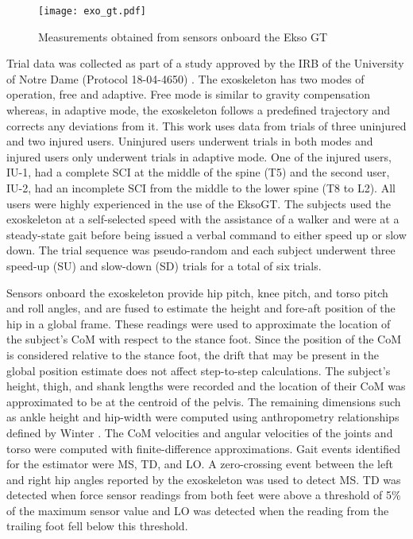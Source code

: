 \begin{figure}
	\centering
	\texttt{[image: exo\_gt.pdf]}
	\vspace{-1em}
	\caption[Measurements obtained from sensors onboard the Ekso GT]{Measurements obtained from sensors onboard the Ekso GT \cite{eksoOperator}}\label{fig:exoOperator}
	\vspace{-1em}
\end{figure}

Trial data was collected as part of a study approved by the IRB of the University of Notre Dame (Protocol 18-04-4650) \cite{gambon2020effects}. The exoskeleton has two modes of operation, free and adaptive. Free mode is similar to gravity compensation whereas, in adaptive mode, the exoskeleton follows a predefined trajectory and corrects any deviations from it. This work uses data from trials of three uninjured and two injured users. Uninjured users underwent trials in both modes and injured users only underwent trials in adaptive mode. One of the injured users, IU-1, had a complete SCI at the middle of the spine (T5) and the second user, IU-2, had an incomplete SCI from the middle to the lower spine (T8 to L2). All users were highly experienced in the use of the EksoGT. The subjects used the exoskeleton at a self-selected speed with the assistance of a walker and were at a steady-state gait before being issued a verbal command to either speed up or slow down. The trial sequence was pseudo-random and each subject underwent three speed-up (SU) and slow-down (SD) trials for a total of six trials.

Sensors onboard the exoskeleton provide hip pitch, knee pitch, and torso pitch and roll angles, and are fused to estimate the height and fore-aft position of the hip in a global frame. These readings were used to approximate the location of the subject's CoM with respect to the stance foot. Since the position of the CoM is considered relative to the stance foot, the drift that may be present in the global position estimate does not affect step-to-step calculations. The subject's height, thigh, and shank lengths were recorded and the location of their CoM was approximated to be at the centroid of the pelvis. The remaining dimensions such as ankle height and hip-width were computed using anthropometry relationships defined by Winter \cite{winter2009biomechanics}. The CoM velocities and angular velocities of the joints and torso were computed with finite-difference approximations. Gait events identified for the estimator were MS, TD, and LO. A zero-crossing event between the left and right hip angles reported by the exoskeleton was used to detect MS. TD was detected when force sensor readings from both feet were above a threshold of 5\% of the maximum sensor value and LO was detected when the reading from the trailing foot fell below this threshold. 

